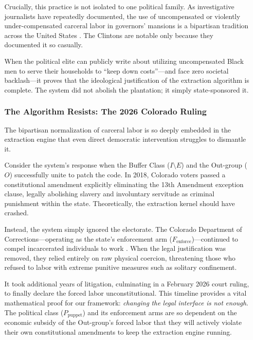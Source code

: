 \documentclass[12pt]{article}
\begin{document}
Crucially, this practice is not isolated to one political family. As investigative journalists have repeatedly documented, the use of uncompensated or violently under-compensated carceral labor in governors' mansions is a bipartisan tradition across the United States \cite{currentaffairs_slaves}. The Clintons are notable only because they documented it so casually.

When the political elite can publicly write about utilizing uncompensated Black men to serve their households to ``keep down costs''---and face zero societal backlash---it proves that the ideological justification of the extraction algorithm is complete. The system did not abolish the plantation; it simply state-sponsored it.

\subsubsection*{The Algorithm Resists: The 2026 Colorado Ruling}

The bipartisan normalization of carceral labor is so deeply embedded in the extraction engine that even direct democratic intervention struggles to dismantle it.

Consider the system's response when the Buffer Class ($I \setminus E$) and the Out-group ($O$) successfully unite to patch the code. In 2018, Colorado voters passed a constitutional amendment explicitly eliminating the 13th Amendment exception clause, legally abolishing slavery and involuntary servitude as criminal punishment within the state. Theoretically, the extraction kernel should have crashed.

Instead, the system simply ignored the electorate. The Colorado Department of Corrections---operating as the state's enforcement arm ($F_{\text{enforce}}$)---continued to compel incarcerated individuals to work \cite{colorado_forced_labor}. When the legal justification was removed, they relied entirely on raw physical coercion, threatening those who refused to labor with extreme punitive measures such as solitary confinement.

It took additional years of litigation, culminating in a February 2026 court ruling, to finally declare the forced labor unconstitutional. This timeline provides a vital mathematical proof for our framework: \textit{changing the legal interface is not enough}. The political class ($P_{\text{puppet}}$) and its enforcement arms are so dependent on the economic subsidy of the Out-group's forced labor that they will actively violate their own constitutional amendments to keep the extraction engine running.
\end{document}
